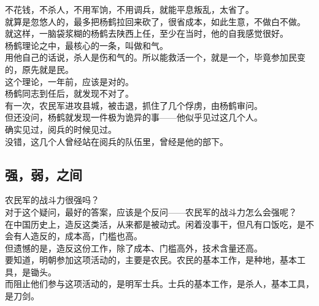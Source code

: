 \begin{multicols}{\theparacolNo}
不花钱，不杀人，不用军饷，不用调兵，就能平息叛乱，太省了。\\

就算是忽悠人的，最多把杨鹤拉回来砍了，很省成本，如此生意，不做白不做。\\

就这样，一脑袋浆糊的杨鹤去陕西上任，至少在当时，他的自我感觉很好。\\

杨鹤理论之中，最核心的一条，叫做和气。\\

用他自己的话说，杀人是伤和气的。所以能救活一个，就是一个，毕竟参加民变的，原先就是民。\\

这个理论，一年前，应该是对的。\\

杨鹤同志到任后，就发现不对了。\\

有一次，农民军进攻县城，被击退，抓住了几个俘虏，由杨鹤审问。\\

但还没问，杨鹤就发现一件极为诡异的事——他似乎见过这几个人。\\

确实见过，阅兵的时候见过。\\

没错，这几个人曾经站在阅兵的队伍里，曾经是他的部下。\\

\subsection{强，弱，之间}
农民军的战斗力很强吗？\\

对于这个疑问，最好的答案，应该是个反问——农民军的战斗力怎么会强呢？\\

在中国历史上，造反这类活，从来都是被动式。闲着没事干，但凡有口饭吃，是不会有人造反的，成本高，门槛也高。\\

但遗憾的是，造反这份工作，除了成本、门槛高外，技术含量还高。\\

要知道，明朝参加这项活动的，主要是农民。农民的基本工作，是种地，基本工具，是锄头。\\

而阻止他们参与这项活动的，是明军士兵。士兵的基本工作，是杀人，基本工具，是刀剑。\\


\end{multicols}
